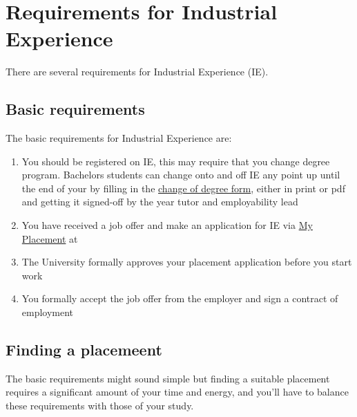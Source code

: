 \documentclass[
]{book}
\providecommand{\tightlist}{%
  \setlength{\itemsep}{0pt}\setlength{\parskip}{0pt}}
\begin{document}
\chapter{Requirements for Industrial Experience}\label{requirements}

There are several requirements for Industrial Experience (IE).

\section{Basic requirements}\label{basic}

The basic requirements for Industrial Experience are:

\begin{enumerate}
\def\labelenumi{\arabic{enumi}.}
\tightlist
\item
  You should be registered on IE, this may require that you change degree program. Bachelors students can change onto and off IE any point up until the end of your by filling in the \href{https://studentnet.cs.manchester.ac.uk/ugt/changedegree.php}{change of degree form}, either in print or pdf and getting it signed-off by the year tutor and employability lead \citep{changedegree}
\item
  You have received a job offer and make an application for IE via \href{https://studentmobility.manchester.ac.uk}{My Placement} at \citep{myplacement}
\item
  The University formally approves your placement application before you start work
\item
  You formally accept the job offer from the employer and sign a contract of employment
\end{enumerate}

\section{Finding a placemeent}\label{finding}

The basic requirements might sound simple but finding a suitable placement requires a significant amount of your time and energy, and you'll have to balance these requirements with those of your study.
\end{document}

